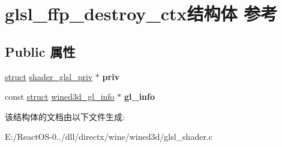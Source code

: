 \hypertarget{structglsl__ffp__destroy__ctx}{}\section{glsl\+\_\+ffp\+\_\+destroy\+\_\+ctx结构体 参考}
\label{structglsl__ffp__destroy__ctx}
\subsection*{Public 属性}
\begin{DoxyCompactItemize}
\item 
\mbox{\label{structglsl__ffp__destroy__ctx_a1fc69271b082c2a1275630ec6b4bea24}} 
\hyperlink{interfacestruct}{struct} \hyperlink{structshader__glsl__priv}{shader\+\_\+glsl\+\_\+priv} $\ast$ {\bfseries priv}
\item 
\mbox{\label{structglsl__ffp__destroy__ctx_a7f581da42a8bffa209df2977d2606a73}} 
const \hyperlink{interfacestruct}{struct} \hyperlink{structwined3d__gl__info}{wined3d\+\_\+gl\+\_\+info} $\ast$ {\bfseries gl\+\_\+info}
\end{DoxyCompactItemize}


该结构体的文档由以下文件生成\+:\begin{DoxyCompactItemize}
\item 
E\+:/\+React\+O\+S-\/0../dll/directx/wine/wined3d/glsl\+\_\+shader.\+c\end{DoxyCompactItemize}
